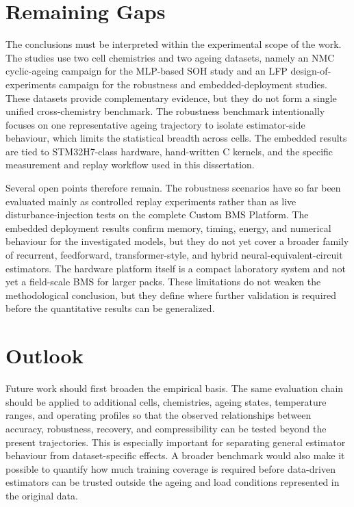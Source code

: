 \documentclass[
    a4paper,
    12pt,
    titlepage,
    bibliography=totoc,
    twoside=on,
    parskip=false,
    numbers=noenddot,
    cleardoublepage=empty,
    DIV=12,
    BCOR=12.0mm,
    headheight=36pt,
    headings=openright
]{scrreprt}
\begin{document}
\section{Remaining Gaps}
The conclusions must be interpreted within the experimental scope of the work. The studies use two cell chemistries and two ageing datasets, namely an NMC cyclic-ageing campaign for the MLP-based SOH study and an LFP design-of-experiments campaign for the robustness and embedded-deployment studies. These datasets provide complementary evidence, but they do not form a single unified cross-chemistry benchmark. The robustness benchmark intentionally focuses on one representative ageing trajectory to isolate estimator-side behaviour, which limits the statistical breadth across cells. The embedded results are tied to STM32H7-class hardware, hand-written C kernels, and the specific measurement and replay workflow used in this dissertation.

Several open points therefore remain. The robustness scenarios have so far been evaluated mainly as controlled replay experiments rather than as live disturbance-injection tests on the complete Custom BMS Platform. The embedded deployment results confirm memory, timing, energy, and numerical behaviour for the investigated models, but they do not yet cover a broader family of recurrent, feedforward, transformer-style, and hybrid neural-equivalent-circuit estimators. The hardware platform itself is a compact laboratory system and not yet a field-scale BMS for larger packs. These limitations do not weaken the methodological conclusion, but they define where further validation is required before the quantitative results can be generalized.

\section{Outlook}
Future work should first broaden the empirical basis. The same evaluation chain should be applied to additional cells, chemistries, ageing states, temperature ranges, and operating profiles so that the observed relationships between accuracy, robustness, recovery, and compressibility can be tested beyond the present trajectories. This is especially important for separating general estimator behaviour from dataset-specific effects. A broader benchmark would also make it possible to quantify how much training coverage is required before data-driven estimators can be trusted outside the ageing and load conditions represented in the original data.
\end{document}
